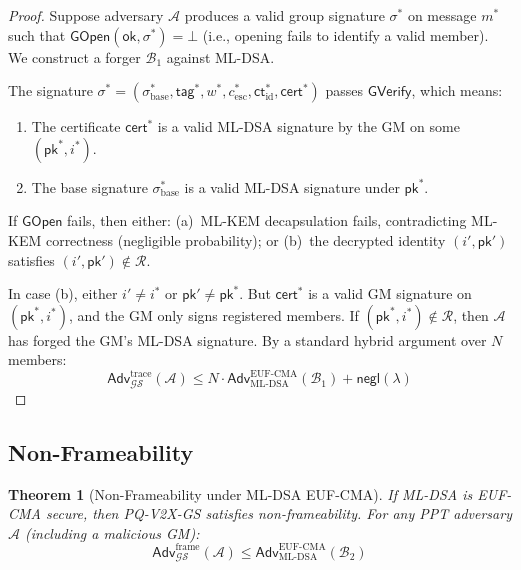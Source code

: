 \documentclass[conference,10pt]{IEEEtran}
\newcommand{\secparam}{\lambda}
\newcommand{\advA}{\mathcal{A}}
\newcommand{\advB}{\mathcal{B}}
\newcommand{\negl}{\mathsf{negl}}
\newtheorem{theorem}{Theorem}
\begin{document}
\begin{proof}
Suppose adversary $\advA$ produces a valid group signature $\sigma^*$ on message $m^*$ such that $\mathsf{GOpen}(\mathsf{ok}, \sigma^*) = \bot$ (i.e., opening fails to identify a valid member). We construct a forger $\advB_1$ against ML-DSA.

The signature $\sigma^* = (\sigma_{\mathrm{base}}^*, \mathsf{tag}^*, w^*, c_{\mathrm{esc}}^*, \mathsf{ct}_{\mathrm{id}}^*, \mathsf{cert}^*)$ passes $\mathsf{GVerify}$, which means:
\begin{enumerate}
    \item The certificate $\mathsf{cert}^*$ is a valid ML-DSA signature by the GM on some $(\mathsf{pk}^*, i^*)$.
    \item The base signature $\sigma_{\mathrm{base}}^*$ is a valid ML-DSA signature under $\mathsf{pk}^*$.
\end{enumerate}

If $\mathsf{GOpen}$ fails, then either: (a)~ML-KEM decapsulation fails, contradicting ML-KEM correctness (negligible probability); or (b)~the decrypted identity $(i', \mathsf{pk}')$ satisfies $(i', \mathsf{pk}') \notin \mathcal{R}$.

In case (b), either $i' \neq i^*$ or $\mathsf{pk}' \neq \mathsf{pk}^*$. But $\mathsf{cert}^*$ is a valid GM signature on $(\mathsf{pk}^*, i^*)$, and the GM only signs registered members. If $(\mathsf{pk}^*, i^*) \notin \mathcal{R}$, then $\advA$ has forged the GM's ML-DSA signature. By a standard hybrid argument over $N$ members:
\begin{equation}
\mathsf{Adv}^{\mathrm{trace}}_{\mathcal{GS}}(\advA) \leq N \cdot \mathsf{Adv}^{\mathrm{EUF\text{-}CMA}}_{\mathrm{ML\text{-}DSA}}(\advB_1) + \negl(\secparam)
\end{equation}
\end{proof}

\subsection{Non-Frameability}

\begin{theorem}[Non-Frameability under ML-DSA EUF-CMA]
\label{thm:nonframe}
If ML-DSA is EUF-CMA secure, then PQ-V2X-GS satisfies non-frameability. For any PPT adversary $\advA$ (including a malicious GM):
\begin{equation}
\mathsf{Adv}^{\mathrm{frame}}_{\mathcal{GS}}(\advA) \leq \mathsf{Adv}^{\mathrm{EUF\text{-}CMA}}_{\mathrm{ML\text{-}DSA}}(\advB_2)
\end{equation}
\end{theorem}
\end{document}
